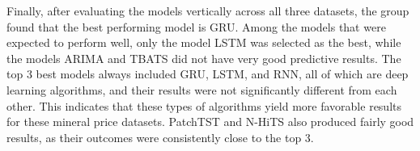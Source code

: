\documentclass{ieeeojies}
\begin{document}
\begin{table}[h!]
    \centering
    \caption{\centering Vertically evaluating models ranking table}
    \label{table:models}
\end{table}

\indent Finally, after evaluating the models vertically across all three datasets, the group found that the best performing model is GRU. Among the models that were expected to perform well, only the model LSTM was selected as the best, while the models ARIMA and TBATS did not have very good predictive results. The top 3 best models always included GRU, LSTM, and RNN, all of which are deep learning algorithms, and their results were not significantly different from each other. This indicates that these types of algorithms yield more favorable results for these mineral price datasets. PatchTST and N-HiTS also produced fairly good results, as their outcomes were consistently close to the top 3. 
\end{document}
